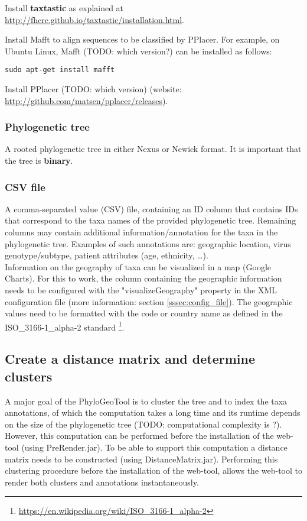 \documentclass[a4paper, 11pt]{article} %
\begin{document}
Install \textbf{taxtastic} as explained at \url{http://fhcrc.github.io/taxtastic/installation.html}.


Install Mafft to align sequences to be classified by PPlacer. 
For example, on Ubuntu Linux, Mafft (TODO: which version?) can be installed as follows:
\begin{verbatim}
sudo apt-get install mafft
\end{verbatim}

Install PPlacer (TODO: which version) (website: \url{http://github.com/matsen/pplacer/releases}).

\subsubsection*{Phylogenetic tree}
A rooted phylogenetic tree in either Nexus or Newick format. It is important that the tree is \textbf{binary}.

\subsubsection*{CSV file}
A comma-separated value (CSV) file, containing an ID column that contains IDs that correspond to the taxa names of the provided phylogenetic tree.
Remaining columns may contain additional information/annotation for the taxa in the phylogenetic tree. Examples of such annotations are: geographic location, virus genotype/subtype, patient attributes (age, ethnicity, \ldots). \\
Information on the geography of taxa can be visualized in a map (Google Charts). For this to work, the column containing the geographic information needs to be configured with the "visualizeGeography" property in the XML configuration file (more information: section \ref{sssec:config_file}). The geographic values need to be formatted with the code or country name as defined in the ISO\_3166-1\_alpha-2 standard \footnote{\url{https://en.wikipedia.org/wiki/ISO\_3166-1\_alpha-2}}.

\subsection{Create a distance matrix and determine clusters}
A major goal of the PhyloGeoTool is to cluster the tree and to index the taxa annotations, of which the computation takes a long time and its runtime depends on the size of the phylogenetic tree (TODO: computational complexity is ?). 
However, this computation can be performed before the installation of the web-tool (using PreRender.jar). To be able to support this computation a distance matrix needs to be constructed (using DistanceMatrix.jar).
Performing this clustering procedure before the installation of the web-tool, allows the web-tool to render both clusters and annotations instantaneously.
\end{document}
